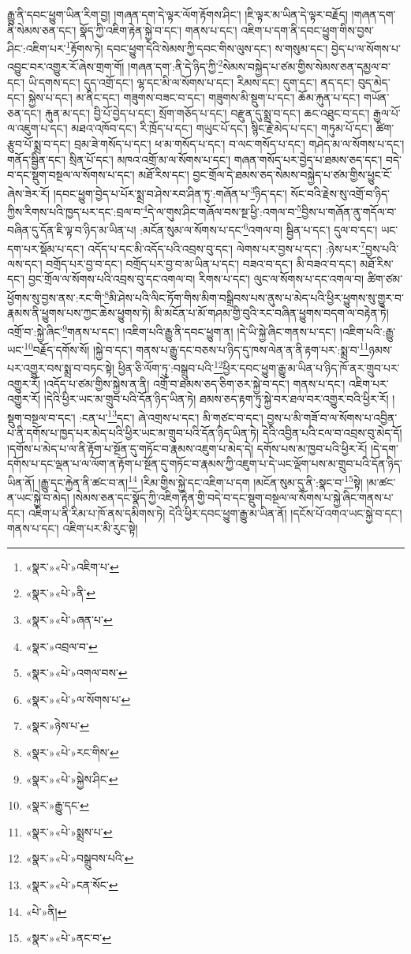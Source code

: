 རྒྱུ་ནི་དབང་ཕྱུག་ཡིན་རིག་བྱ། །གཞན་དག་དེ་ལྟར་ལོག་རྟོགས་ཤིང་། །ཇི་ལྟར་མ་ཡིན་དེ་ལྟར་བརྗོད། །གཞན་དག་ནི་སེམས་ཅན་དང་། སྣོད་ཀྱི་འཇིག་རྟེན་སྐྱེ་བ་དང་། གནས་པ་དང་། འཇིག་པ་དག་ནི་དབང་ཕྱུག་གིས་བྱས་ཤིང་:འཇིག་པར་\footnote{«སྣར་»«པེ་»འཇིག་པ་}རྟོགས་ཏེ། དབང་ཕྱུག་དེའི་སེམས་ཀྱི་དབང་གིས་ལུས་དང་། ས་གསུམ་དང་། བྱེད་པ་ལ་སོགས་པ་འབྱུང་བར་འགྱུར་རོ་ཞེས་གྲག་གོ། །གཞན་དག་:ནི་དེ་ཉིད་ཀྱི་\footnote{«སྣར་»«པེ་»ནི་}སེམས་བསྐྱེད་པ་ཙམ་གྱིས་སེམས་ཅན་དམྱལ་བ་དང་། ཡི་དགས་དང་། དུད་འགྲོ་དང་། ལྷ་དང་མི་ལ་སོགས་པ་དང་། རིམས་དང་། དུག་དང་། ནད་དང་། བུད་མེད་དང་། སྐྱེས་པ་དང་། མ་ནིང་དང་། གཟུགས་བཟང་བ་དང་། གཟུགས་མི་སྡུག་པ་དང་། ཆོམ་རྐུན་པ་དང་། གཡོན་ཅན་དང་། རྐུན་མ་དང་། བྱི་པོ་བྱེད་པ་དང་། སྲོག་གཅོད་པ་དང་། བརྫུན་དུ་སྨྲ་བ་དང་། ཆང་འཐུང་བ་དང་། རྒྱལ་པོ་ལ་འཇུག་པ་དང་། མཐའ་འཁོབ་དང་། རི་ཁྲོད་པ་དང་། གཡུང་པོ་དང་། སྙིང་རྗེ་མེད་པ་དང་། གཏུམ་པོ་དང་། ཚིག་རྩུབ་པོ་སྨྲ་བ་དང་། བྲམ་ཟེ་གསོད་པ་དང་། ཕ་མ་གསོད་པ་དང་། བ་ལང་གསོད་པ་དང་། གཤེད་མ་ལ་སོགས་པ་དང་། གནོད་སྦྱིན་དང་། སྲིན་པོ་དང་། མཁའ་འགྲོ་མ་ལ་སོགས་པ་དང་། གཞན་གསོད་པར་བྱེད་པ་ཐམས་ཅད་དང་། བདེ་བ་དང་སྡུག་བསྔལ་ལ་སོགས་པ་དང་། མཐོ་རིས་དང་། བྱང་གྲོལ་དེ་ཐམས་ཅད་སེམས་བསྐྱེད་པ་ཙམ་གྱིས་ཕྱུང་ངོ་ཞེས་ཟེར་རོ། །དབང་ཕྱུག་བྱེད་པ་པོར་སྨྲ་བ་ཤེས་རབ་ཤིན་ཏུ་:གཞོན་པ་\footnote{«སྣར་»«པེ་»ཞན་པ་}ཉིད་དང་། སོང་བའི་རྗེས་སུ་འགྲོ་བ་ཉིད་ཀྱིས་རིགས་པའི་ཁྱད་པར་དང་:བྲལ་བ་\footnote{«སྣར་»འབྲལ་བ་}དེ་ལ་གུས་ཤིང་གཞོལ་བས་སྔ་ཕྱི་:འགལ་བ་\footnote{«སྣར་»«པེ་»འགལ་བས་}བྱིས་པ་གཞོན་ནུ་གདོལ་བ་བཞིན་དུ་དོན་ཇི་ལྟ་བ་ཉིད་མ་ཡིན་པ། :མངོན་སུམ་ལ་སོགས་པ་དང་\footnote{«སྣར་»«པེ་»ལ་སོགས་པ་}འགལ་བ། སྦྱིན་པ་དང་། དུལ་བ་དང་། ཡང་དག་པར་སྡོམ་པ་དང་། འདོད་པ་དང་མི་འདོད་པའི་འབྲས་བུ་དང་། ལེགས་པར་བྱས་པ་དང་། :ཉེས་པར་\footnote{«སྣར་»ཉེས་པ་}བྱས་པའི་ལས་དང་། བགྲོད་པར་བྱ་བ་དང་། བགྲོད་པར་བྱ་བ་མ་ཡིན་པ་དང་། བཟའ་བ་དང་། མི་བཟའ་བ་དང་། མཐོ་རིས་དང་། བྱང་གྲོལ་ལ་སོགས་པའི་འབྲས་བུ་དང་འགལ་བ། རིགས་པ་དང་། ལུང་ལ་སོགས་པ་དང་འགལ་བ། ཚིག་ཙམ་ཕྱོགས་སུ་བྱས་ནས་:རང་གི་\footnote{«སྣར་»«པེ་»རང་གིས་}མི་ཤེས་པའི་ལིང་ཏོག་གིས་མིག་བསྒྲིབས་པས་ནུས་པ་མེད་པའི་ཕྱིར་ཕྱུགས་སུ་གྱུར་བ་རྣམས་ནི་ཕྱུགས་པས་ཀྱང་ཆེས་ཕྱུགས་ཏེ། མི་མངོན་པ་མོ་གཤམ་གྱི་བུའི་རང་བཞིན་ཕྱུགས་བདག་ལ་བརྟེན་ཏེ། འགྲོ་བ་:སྐྱེ་ཞིང་\footnote{«སྣར་»«པེ་»སྐྱེས་ཤིང་}གནས་པ་དང་། །འཇིག་པའི་རྒྱུ་ནི་དབང་ཕྱུག་ན། །དེ་ཡི་སྐྱེ་ཞིང་གནས་པ་དང་། །འཇིག་པའི་:རྒྱུ་ཡང་\footnote{«སྣར་»རྒྱུ་དང་}བརྗོད་དགོས་སོ། །སྐྱེ་བ་དང་། གནས་པ་རྒྱུ་དང་བཅས་པ་ཉིད་དུ་ཁས་ལེན་ན་ནི་རྟག་པར་:སྨྲ་བ་\footnote{«སྣར་»«པེ་»སྨྲས་པ་}ཉམས་པར་འགྱུར་བས་སྨྲ་བ་བཏང་སྟེ། ཕྱིན་ཅི་ལོག་ཏུ་:བསྒྲུབ་པའི་\footnote{«སྣར་»«པེ་»བསྒྲུབས་པའི་}ཕྱིར་དབང་ཕྱུག་རྒྱུ་མ་ཡིན་པ་ཉིད་ཁོ་ནར་གྲུབ་པར་འགྱུར་རོ། །འདོད་པ་ཙམ་གྱིས་སྐྱེས་ན་ནི། འགྲོ་བ་ཐམས་ཅད་ཅིག་ཅར་སྐྱེ་བ་དང་། གནས་པ་དང་། འཇིག་པར་འགྱུར་རོ། །དེའི་ཕྱིར་ཡང་མ་གྲུབ་པའི་དོན་ཉིད་ཡིན་ཏེ། ཐམས་ཅད་རྟག་ཏུ་སྐྱེ་བར་ཐལ་བར་འགྱུར་བའི་ཕྱིར་རོ། །སྡུག་བསྔལ་བ་དང་། :ངན་པ་\footnote{«སྣར་»«པེ་»ངན་སོང་}དང་། ཞེ་འགྲས་པ་དང་། མི་གཙང་བ་དང་། བྱས་པ་མི་གཟོ་བ་ལ་སོགས་པ་འབྱིན་པ་ནི་དགོས་པ་ཁྱད་པར་མེད་པའི་ཕྱིར་ཡང་མ་གྲུབ་པའི་དོན་ཉིད་ཡིན་ཏེ། དེའི་འབྱིན་པའི་ངལ་བ་འབྲས་བུ་མེད་དོ། །དགོས་པ་མེད་པ་ལ་ནི་རྟོག་པ་སྔོན་དུ་གཏོང་བ་རྣམས་འཇུག་པ་མེད་དེ། དགོས་པས་མ་ཁྱབ་པའི་ཕྱིར་རོ། །དེ་དག་དགོས་པ་དང་ལྡན་པ་ལ་ལོག་ན་རྟོག་པ་སྔོན་དུ་གཏོང་བ་རྣམས་ཀྱི་འཇུག་པ་དེ་ཡང་ལྡོག་པས་མ་གྲུབ་པའི་དོན་ཉིད་ཡིན་ནོ། །རྒྱུ་དང་རྐྱེན་ནི་ཚང་བ་ན།\footnote{«པེ་»ནི།} །རིམ་གྱིས་སྐྱེ་དང་འཇིག་པ་དག །མངོན་སུམ་དུ་ནི་:སྣང་བ་\footnote{«སྣར་»«པེ་»ནང་བ་}སྟེ། །མ་ཚང་ན་ཡང་སྐྱེ་བ་མེད། །སེམས་ཅན་དང་སྣོད་ཀྱི་འཇིག་རྟེན་གྱི་བདེ་བ་དང་སྡུག་བསྔལ་ལ་སོགས་པ་སྐྱེ་ཞིང་གནས་པ་དང་། འཇིག་པ་ནི་རིམ་པ་ཁོ་ནས་དམིགས་ཏེ། དེའི་ཕྱིར་དབང་ཕྱུག་རྒྱུ་མ་ཡིན་ནོ། །དངོས་པོ་འགའ་ཡང་སྐྱེ་བ་དང་། གནས་པ་དང་། འཇིག་པར་མི་རུང་སྟེ། 